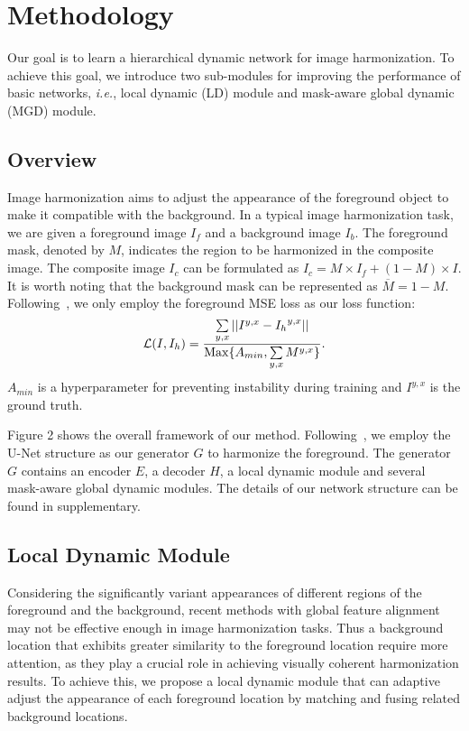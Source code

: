 \documentclass[sigconf]{acmart}
\begin{document}
\section{Methodology}
Our goal is to learn a hierarchical dynamic network for image harmonization. To achieve this goal, we introduce two sub-modules for improving the performance of basic networks, \emph{i.e.}, local dynamic (LD) module and mask-aware global dynamic (MGD) module.

\subsection{Overview}
Image harmonization aims to adjust the appearance of the foreground object to make it compatible with the background. In a typical image harmonization task, we are given a foreground image $I_f$ and a background image $I_b $. The foreground mask, denoted by $M$, indicates the region to be harmonized in the composite image. The composite image $I_c$ can be formulated as $I_c = M \times I_f + (1 - M) \times I$. It is worth noting that the background mask can be represented as $\overline{M} = 1 - M$.
Following~\cite{sofiiuk2021foreground}, we only employ the foreground MSE loss as our loss function:
\begin{equation}
	\mathcal{L}(I, I_h) = \frac{\sum\limits_{y,x} ||I^{y,x}-{I_h}^{y,x}||}{{\rm Max}\{A_{min}, \sum\limits_{y,x}M^{y,x}\}} .
\end{equation}
$A_{min}$ is a hyperparameter for preventing instability during training and $I^{y,x}$ is the ground truth. 

Figure 2 shows the overall framework of our method. Following~\cite{AdaIN,Bargainnet,CDTNet,Harmonizer}, we employ the U-Net structure as our generator $G$ to harmonize the foreground. The generator $G$ contains an encoder $E$, a decoder $H$, a local dynamic module and several mask-aware global dynamic modules. The details of our network structure can be found in supplementary.
\subsection{Local Dynamic Module}
Considering the significantly variant appearances of different regions of the
foreground and the background, recent methods with global feature alignment may not be effective enough in image harmonization tasks. Thus a background location that exhibits greater similarity to the foreground location require more attention, as they play a crucial role in achieving visually coherent harmonization results. To achieve this, we propose a local dynamic module that can adaptive adjust the appearance of each foreground location by matching and fusing related background locations.
\end{document}
